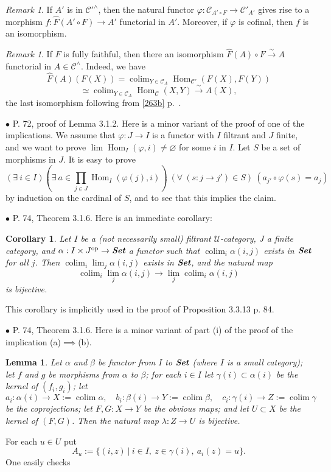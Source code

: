 \documentclass[12pt]{article}
\newtheorem{lem}[thm]{Lemma}
\newtheorem{cor}[thm]{Corollary}
\theoremstyle{remark}%
\newtheorem{rk}[thm]{Remark}%
\newcommand{\bu}{\bullet}
\newcommand{\n}{\noindent}
\newcommand{\cc}{\mathcal}
\newcommand{\C}{\mathcal C}
\newcommand{\U}{\mathcal U}
\newcommand{\p}{\varphi}
\newcommand{\xr}{\xrightarrow}
\DeclareMathOperator*{\coli}{colim}
\DeclareMathOperator{\Hom}{Hom}
\DeclareMathOperator{\h}{Hom}
\DeclareMathOperator{\op}{op}
\begin{document}
\begin{rk}\label{cof}
If $A'$ is in $\cc C'^\wedge$, then the natural functor $\p:\cc C_{A'\circ F}\to\cc C'_{A'}$ gives rise to a morphism $f:\widehat F(A'\circ F)\to A'$ functorial in $A'$. Moreover, if $\p$ is cofinal, then $f$ is an isomorphism. 
\end{rk} 

\begin{rk}
If $F$ is fully faithful, then there an isomorphism $\widehat F(A)\circ F\xr\sim A$ functorial in $A\in\C^\wedge$. Indeed, we have 
$$
\widehat F(A)(F(X))=\coli_{Y\in\C_A}\Hom_{\C'}(F(X),F(Y))
$$
$$
\simeq\coli_{Y\in\C_A}\Hom_\C(X,Y)\xr\sim A(X),
$$
the last isomorphism following from \eqref{263b} p.~\pageref{263b}. 
\end{rk} 


\n$\bu$ P. 72, proof of Lemma 3.1.2. Here is a minor variant of the proof of one of the implications. We assume that $\p:J\to I$ is a functor with $I$ filtrant and $J$ finite, and we want to prove $\lim\h_I(\p,i)\neq\varnothing$ for some $i$ in $I$. Let $S$ be a set of morphisms in $J$. It is easy to prove 
$$
(\exists\ i\in I)\left(\exists\ a\in\prod_{j\in J}\h_I(\p(j),i)\right)\ (\forall\ (s:j\to j')\in S)\ (a_{j'}\circ\p(s)=a_j) 
$$ 
by induction on the cardinal of $S$, and to see that this implies the claim. 


\n$\bu$ P. 74, Theorem 3.1.6. Here is an immediate corollary: 
%
\begin{cor}\label{316}
Let $I$ be a (not necessarily small) filtrant $\U$-category, $J$ a finite category, and $\alpha:I\times J^{\op}\to\textbf{\em Set}$ a functor such that $\coli_i\alpha(i,j)$ exists in $\textbf{\em Set}$ for all $j$. Then $\coli_i\lim_j\alpha(i,j)$ exists in $\textbf{\em Set}$, and the natural map 
$$
\coli_i\lim_j\alpha(i,j)\to
\lim_j\coli_i\alpha(i,j)
$$ 
is bijective. 
\end{cor}
%
This corollary is implicitly used in the proof of Proposition 3.3.13 p. 84. 


\n$\bu$ P. 74, Theorem 3.1.6. Here is a minor variant of part (i) of the proof of the implication (a)$\implies$(b).\smallskip 

\begin{lem} 
Let $\alpha$ and $\beta$ be functor from $I$ to $\textbf{\em Set}$ (where $I$ is a small category); let $f$ and $g$ be morphisms from $\alpha$ to $\beta$; for each $i\in I$ let $\gamma(i)\subset\alpha(i)$ be the kernel of $(f_i,g_i)$; let 
$$
a_i:\alpha(i)\to X:=\coli\alpha,\quad 
b_i:\beta(i)\to Y:=\coli\beta,\quad 
c_i:\gamma(i)\to Z:=\coli\gamma
$$ 
be the coprojections; let $F,G:X\to Y$ be the obvious maps; and let $U\subset X$ be the kernel of $(F,G)$. Then the natural map $\lambda:Z\to U$ is bijective.
\end{lem}
% 
\n{\em Proof.} For each $u\in U$ put 
$$
A_u:=\{(i,z)\ |\ i\in I,\ z\in\gamma(i),\ a_i(z)=u\}.
$$ 
One easily checks 
\end{document}
